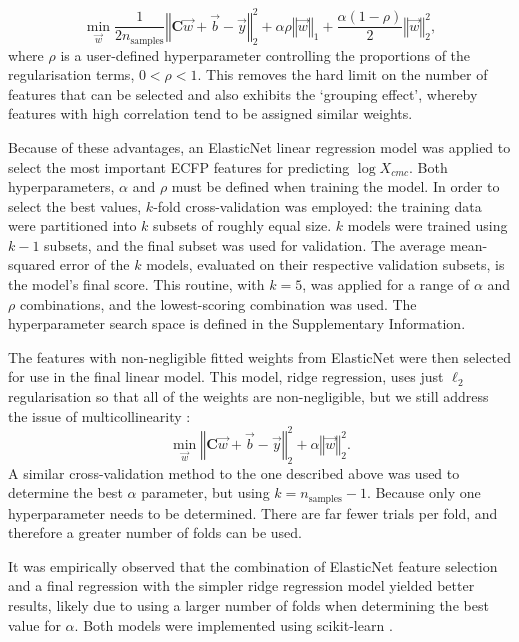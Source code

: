\begin{equation}
    \label{eq:elastic}
    \min_{\vec{w}} { \frac{1}{2n_{\text{samples}}} \left \Vert \mathbf{C}\vec{w} + \vec{b}- \vec{y} \right \Vert_2 ^ 2 + \alpha\rho \left \Vert \vec{w} \right \Vert_1} + \frac{\alpha(1 - \rho)}{2} \left \Vert \vec{w} \right \Vert_2^2,
\end{equation}
where $\rho$ is a user-defined hyperparameter controlling the proportions of the regularisation terms, $0 < \rho < 1$. This removes the hard limit on the number of features that can be selected and also exhibits the `grouping effect',
whereby features with high correlation tend to be assigned similar weights.

Because of these advantages, an ElasticNet linear regression model was applied to select the most important ECFP features for predicting $\log X_{cmc}$. Both hyperparameters, $\alpha$ and $\rho$ must be defined when training the model.
In order to select the best values, $k$-fold cross-validation was employed: the training data were partitioned into $k$ subsets of roughly equal size. $k$ models were trained using $k-1$ subsets, and the final subset was used for
validation. The average mean-squared error of the $k$ models, evaluated on their respective validation subsets, is the model's final score. This routine, with $k=5$, was applied for a range of $\alpha$ and $\rho$ combinations, and the
lowest-scoring combination was used. The hyperparameter search space is defined in the Supplementary Information.

The features with non-negligible fitted weights from ElasticNet were then selected for use in the final linear model. This model, ridge regression, uses just $\ell_2$ regularisation so that all of the weights are non-negligible, but we
still address the issue of multicollinearity \cite{mcdonaldRidgeRegression2009}:
\begin{equation}
    \min_{\vec{w}} \left \Vert \mathbf{C} \vec{w} + \vec{b} - \vec{y} \right \Vert_2^2 + \alpha \left \Vert \vec{w}\right \Vert_2^2.
\end{equation}
A similar cross-validation method to the one described above was used to determine the best $\alpha$ parameter, but using $k=n_\text{samples}-1$. Because only one hyperparameter needs to be determined. There are far fewer trials per
fold, and therefore a greater number of folds can be used.

It was empirically observed that the combination of ElasticNet feature selection and a final regression with the simpler ridge regression model yielded better results, likely due to using a larger number of folds when determining the best value for $\alpha$. Both models were implemented using scikit-learn \cite{pedregosaScikitlearnMachineLearning2011}.

